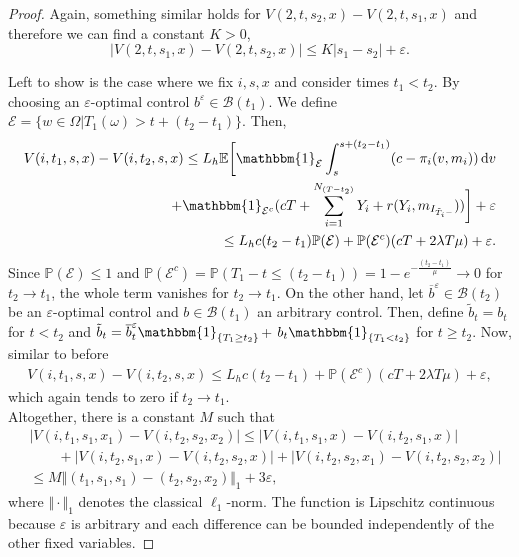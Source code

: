 \documentclass[a4paper]{scrartcl}
\theoremstyle{remark}
\theoremstyle{definition}
\numberwithin{equation}{section}
\newcommand*\diff{\mathop{}\!\mathrm{d}}
\newcommand{\ind}{\mathbbm{1}_}
\begin{document}
\begin{proof}
Again, something similar holds for $V(2,t,s_2,x)-V(2,t,s_1,x)$ and therefore we can find a constant $K>0$, 
\begin{equation*}
    |V(2,t,s_1,x)-V(2,t,s_2,x)| \leq K|s_1-s_2|+\varepsilon.
\end{equation*}

Left to show is the case where we fix $i,s,x$ and consider times $t_1<t_2$. By choosing an $\varepsilon$-optimal control $b^\varepsilon \in \mathcal{B}(t_1)$. We define $\mathcal{E}=\{w \in \Omega | T_1(\omega)>t+(t_2-t_1)\}$. Then,
    \begin{align*}
        V(i,t_1,s,x)-V(i,t_2,s,x) \leq L_h \mathbb{E}\biggl[\ind{\mathcal{E}} \int_s^{s+(t_2-t_1)} (c-\pi_{i}(v,m_{i})) \diff v\\ + \ind{\mathcal{E}^c} (cT+\sum_{i=1}^{N_{(T-t_2)}} Y_i+r(Y_i,m_{I_{\tilde{T}_{i}-}}))\biggr] + \varepsilon\\
        \leq L_h c(t_2-t_1) \mathbb{P}(\mathcal{E}) + \mathbb{P}(\mathcal{E}^c)(cT+2\lambda T \mu)+\varepsilon.
    \end{align*}
Since $\mathbb{P}(\mathcal{E}) \leq 1 $ and  $\mathbb{P}(\mathcal{E}^c)=\mathbb{P}(T_1-t\leq(t_2-t_1))=1-e^{-\frac{(t_2-t_1)}{\mu}}\rightarrow 0$ for $t_2\rightarrow t_1$, the whole term vanishes for $t_2\rightarrow t_1$. On the other hand, let $\overline{b}^{\varepsilon} \in \mathcal{B}(t_2)$ be an $\varepsilon$-optimal control and $b \in \mathcal{B}(t_1)$ an arbitrary control. Then, define $\tilde{b}_t=b_t$ for $t < t_2$ and $\tilde{b}_t=\overline{b}^{\varepsilon}_t \ind{\{T_1\geq t_2\}}$+ $b_t \ind{\{T_1< t_2\}}$ for $t \geq t_2$. Now, similar to before
\begin{align*}
       V(i,t_1,s,x)-V(i,t_2,s,x) \leq L_h c(t_2-t_1) + \mathbb{P}(\mathcal{E}^c)(cT+2\lambda T \mu)+\varepsilon,
    \end{align*}
which again tends to zero if $t_2 \rightarrow t_1$.\\
Altogether, there is a constant $M$ such that
\begin{align*}
    &|V(i,t_1,s_1,x_1)-V(i,t_2,s_2,x_2)|\leq |V(i,t_1,s_1,x)-V(i,t_2,s_1,x)|\\&\qquad +|V(i,t_2,s_1,x)-V(i,t_2,s_2,x)|+|V(i,t_2,s_2,x_1)-V(i,t_2,s_2,x_2)|\\&\leq M \Vert(t_1,s_1,s_1)-(t_2,s_2,x_2)\Vert_1 + 3\varepsilon,
\end{align*}
where $\Vert\cdot\Vert_1 $ denotes the classical $\ell_1$-norm.
The function is Lipschitz continuous because $\varepsilon$ is arbitrary and each difference can be bounded independently of the other fixed variables.
\end{proof}
\end{document}

